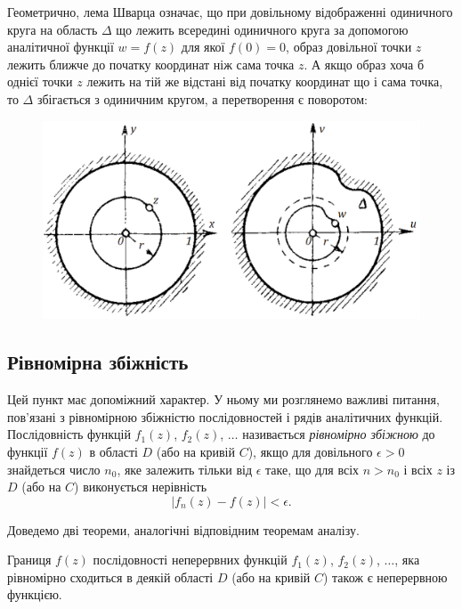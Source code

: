 Геометрично, лема Шварца означає, що при довільному відображенні одиничного круга на область $\Delta$ що лежить всередині одиничного круга за допомогою аналітичної функції $w = f(z)$ для якої $f(0) = 0$, образ довільної точки $z$ лежить ближче до початку координат ніж сама точка $z$. А якщо образ хоча б однієї точки $z$ лежить на тій же відстані від початку координат що і сама точка, то $\Delta$ збігається з одиничним кругом, а перетворення є поворотом:

	\begin{figure}[H]
	\centering
	\includegraphics[width=.8\linewidth]{mal-25.png}
\end{figure}


\subsection{Рівномірна збіжність}
Цей пункт має допоміжний характер. У ньому ми розглянемо важливі питання, пов'язані з рівномірною збіжністю послідовностей і рядів аналітичних функцій. \\

Послідовність функцій $f_1(z)$, $f_2(z)$, $\ldots$ називається \textit{рівномірно збіжною} до функції $f(z)$ в області $D$ (або на кривій $C$), якщо для довільного $\epsilon > 0$ знайдеться число $n_0$, яке залежить тільки від $\epsilon$ таке, що для всіх $n > n_0$ і всіх $z$ із $D$ (або на $C$) виконується нерівність
\begin{equation}
	\label{eq:4.6.1}
	|f_n(z) - f(z)| < \epsilon.
\end{equation}

Доведемо дві теореми, аналогічні відповідним теоремам аналізу.

\begin{theorem}
\label{th:4.6.1}
Границя $f(z)$ послідовності неперервних функцій $f_1(z)$, $f_2(z)$, $\ldots$, яка рівномірно сходиться в деякій області $D$ (або на кривій $C$) також є неперервною функцією.
\end{theorem}


